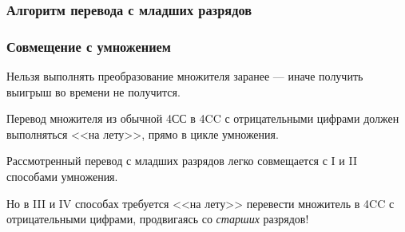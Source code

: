 \begin{frame}
\end{frame}

\begin{frame}
    \frametitle{Алгоритм перевода с младших разрядов}

    \begin{algorithmic}[1]
        
            \ELSE
            \ENDIF
        \ENDFOR
        
    \end{algorithmic}
\end{frame}

\begin{frame}
    \frametitle{Совмещение с умножением}
    
    Нельзя выполнять преобразование множителя заранее --- иначе получить выигрыш во времени не получится.
    
    \begin{block}{Перевод множителя из обычной 4СС в}
        4CC с отрицательными цифрами должен выполняться <<на лету>>, прямо в цикле умножения.
    \end{block}
    
    Рассмотренный перевод с младших разрядов легко совмещается с I и II способами умножения.
    
    \begin{block}{Но в III и IV способах требуется}
        <<на лету>> перевести множитель в 4CC с отрицательными цифрами, продвигаясь со \emph{старших} разрядов!
    \end{block}
\end{frame}

